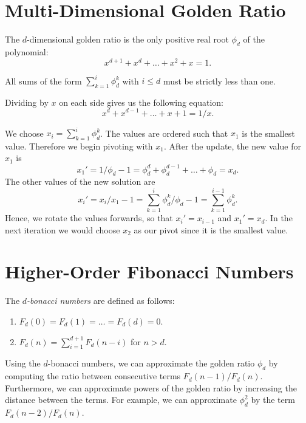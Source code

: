 \documentclass[english,version-2020-11]{uzl-thesis}
\begin{document}
\section{Multi-Dimensional Golden Ratio}

\begin{definition}
  The $d$-dimensional golden ratio is the only positive real root $\phi_d$ of the polynomial:
  \[
    x^{d+1} + x^d + \dots + x^2 + x = 1.
  \]
\end{definition}

All sums of the form $\sum_{k=1}^i \phi_d^k$ with $i \le d$ must be strictly less than one.

Dividing by $x$ on each side gives us the following equation:
\[
  x^d + x^{d-1} + \dots + x + 1 = 1/x.
\]

We choose $x_i = \sum_{k = 1}^i \phi_d^k$.
The values are ordered such that $x_1$ is the smallest value.
Therefore we begin pivoting with $x_1$.
After the update, the new value for $x_1$ is
\[
  x_1' = 1/\phi_d - 1 = \phi_d^d + \phi_d^{d-1} + \dots + \phi_d = x_d.
\]
The other values of the new solution are
\[
  x_i' = x_i / x_1 - 1 = \sum_{k = 1}^i \phi_d^k / \phi_d - 1 = \sum_{k=1}^{i-1} \phi_d^k.
\]
Hence, we rotate the values forwards, so that $x_i' = x_{i-1}$ and $x_1' = x_d$.
In the next iteration we would choose $x_2$ as our pivot since it is the smallest value.

\section{Higher-Order Fibonacci Numbers}

\begin{definition}
  The \emph{$d$-bonacci numbers} are defined as follows:
  \begin{enumerate}
    \item $F_d(0) = F_d(1) = \dots = F_d(d) = 0$.
    \item $F_d(n) = \sum_{i = 1}^{d+1} F_d(n - i)$ for $n > d$.
  \end{enumerate}
\end{definition}

Using the $d$-bonacci numbers, we can approximate the golden ratio $\phi_d$
by computing the ratio between consecutive terms $F_d(n - 1) / F_d(n)$.
Furthermore, we can approximate powers of the golden ratio by increasing the distance between the terms.
For example, we can approximate $\phi_d^2$ by the term $F_d(n - 2) / F_d(n)$.
\end{document}
